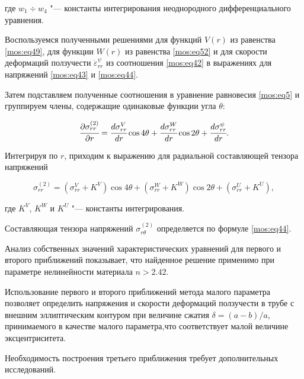 где $w_1 \div w_4$  "--- константы интегрирования неоднородного дифференциального уравнения.



Воспользуемся полученными решениями для функций $V(r)$ из  равенства \eqref{mos:eq49}, для функции $W(r)$ из  равенства \eqref{mos:eq52} и для скорости деформаций ползучести $ \dot{\varepsilon}_{rr} ^{\psi}$ из соотношения \eqref{mos:eq42} в выражениях для напряжений \eqref{mos:eq43} и \eqref{mos:eq44}. 

Затем подставляем полученные соотношения в уравнение равновесия \eqref{mos:eq5} и группируем члены, содержащие одинаковые функции угла $\theta$:

$$\cfrac{\partial\sigma_{rr}^{(2)}}{\partial r}=\cfrac{d\sigma_{rr}^V}{dr}\cos{4\theta}+\cfrac{d\sigma_{rr}^W}{dr}\cos{2\theta}+\cfrac{d\sigma_{rr}^\psi}{dr}.$$

Интегрируя по $r$, приходим к выражению для радиальной составляющей тензора напряжений

\begin{equation}

\sigma_{rr}^{(2)}=(\sigma_{rr}^V+K^V)\cos{4\theta}+(\sigma_{rr}^W+K^W)\cos{2\theta}+(\sigma_{rr}^U+K^U) ,

\end{equation}

где $K^V$, $K^W$ и $K^U$ "--- константы интегрирования.



Составляющая тензора напряжений $\sigma_{r\theta}^{(2)}$ определяется по формуле \eqref{mos:eq44}.

Анализ собственных значений характеристических уравнений для первого и второго приближений показывает, что найденное решение применимо при параметре нелинейности материала $n>2.42$.  



Использование первого и второго приближений метода малого параметра позволяет определить напряжения и скорости деформаций ползучести в  трубе с внешним эллиптическим контуром  при величине сжатия $\delta=({a-b})/a$, принимаемого в качестве малого параметра,что соответствует малой величине эксцентриситета. 



Необходимость построения третьего приближения требует дополнительных исследований.







\smallskip



